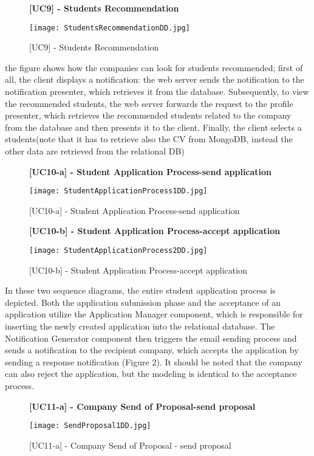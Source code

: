 		
		\begin{figure}[H]
			\centering
			{\bfseries [UC9] - Students Recommendation}
			\caption{[UC9] - Students Recommendation}
			\texttt{[image: StudentsRecommendationDD.jpg]}
			
		\end{figure}
		
		the figure shows how the companies can look for students recommended; first of all, the client displays a notification: the web server sends the notification to the notification presenter, which retrieves it from the database. Subsequently, to view the recommended students, the web server forwards the request to the profile presenter, which retrieves the recommended students related to the company from the database and then presents it to the client. Finally, the client selects a students(note that it has to retrieve also the CV from MongoDB, instead the other data are retrieved from the relational DB)
		
		\begin{figure}[H]
			\centering
			{\bfseries [UC10-a] - Student Application Process-send application}
			\caption{[UC10-a] - Student Application Process-send application}
			\texttt{[image: StudentApplicationProcess1DD.jpg]}
			
		\end{figure}
		
		\begin{figure}[H]
			\centering
			{\bfseries [UC10-b] - Student Application Process-accept application}
			\caption{[UC10-b] - Student Application Process-accept application}
			\texttt{[image: StudentApplicationProcess2DD.jpg]}
			
		\end{figure}
		
		In these two sequence diagrams, the entire student application process is depicted. Both the application submission phase and the acceptance of an application utilize the Application Manager component, which is responsible for inserting the newly created application into the relational database. The Notification Generator component then triggers the email sending process and sends a notification to the recipient company, which accepts the application by sending a response notification (Figure 2). It should be noted that the company can also reject the application, but the modeling is identical to the acceptance process.
		
		
		
		\begin{figure}[H]
			\centering
			{\bfseries [UC11-a] - Company Send of Proposal-send proposal}
			\caption{[UC11-a] - Company Send of Proposal - send proposal}
			\texttt{[image: SendProposal1DD.jpg]}
			
		\end{figure}
		
